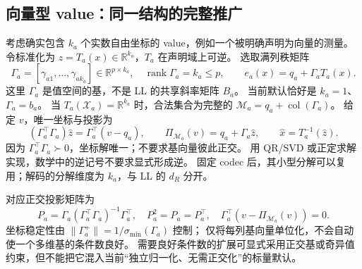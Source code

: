 \documentclass[11pt,UTF8,fontset=fandol]{ctexart}
\numberwithin{equation}{section}
\theoremstyle{definition}
\begin{document}
\subsection{向量型 value：同一结构的完整推广}
考虑确实包含 $k_a$ 个实数自由坐标的 value，例如一个被明确声明为向量的测量。
令标准化为 $z=T_a(x)\in\mathbb R^{k_a}$，$T_a$ 在声明域上可逆。
选取满列秩矩阵
\begin{equation}
 \Gamma_a=[\gamma_{a1},\ldots,\gamma_{ak_a}]\in\mathbb R^{p\times k_a},
 \quad \operatorname{rank}\Gamma_a=k_a\le p,\qquad
 e_a(x)=q_a+\Gamma_aT_a(x).
 \label{v52:eq:general-affine-code}
\end{equation}
这里 $\Gamma_a$ 是值空间的基，不是 LL 的共享斜率矩阵 $B_a$。
当前默认恰好是 $k_a=1$、$\Gamma_a=b_a$。
当 $T_a(\mathcal X_a)=\mathbb R^{k_a}$ 时，合法集合为完整的
$\mathcal M_a=q_a+\operatorname{col}(\Gamma_a)$。
给定 $v$，唯一坐标与投影为
\begin{equation}
 \boxed{(\Gamma_a^\top\Gamma_a)\widehat z=\Gamma_a^\top(v-q_a),\qquad
 \Pi_{\mathcal M_a}(v)=q_a+\Gamma_a\widehat z,\qquad
 \widehat x=T_a^{-1}(\widehat z).}
 \label{v52:eq:general-affine-decode}
\end{equation}
因为 $\Gamma_a^\top\Gamma_a\succ0$，坐标解唯一；不要求基向量彼此正交。
用 QR/SVD 或正定求解实现，数学中的逆记号不要求显式形成逆。
固定 codec 后，其小型分解可以复用；解码的分解维度为 $k_a$，与 LL 的 $d_R$ 分开。

对应正交投影矩阵为
\begin{equation}
 P_a=\Gamma_a(\Gamma_a^\top\Gamma_a)^{-1}\Gamma_a^\top,
 \quad P_a^2=P_a=P_a^\top,\quad
 \Gamma_a^\top(v-\Pi_{\mathcal M_a}(v))=0.
 \label{v52:eq:general-projector}
\end{equation}
坐标稳定性由 $\|\Gamma_a^+\|=1/\sigma_{\min}(\Gamma_a)$ 控制；
仅将每列基向量单位化，不会自动使一个多维基的条件数良好。
需要良好条件数的扩展可显式采用正交基或奇异值约束，但不能把它混入当前“独立归一化、无需正交化”的标量默认。
\end{document}
